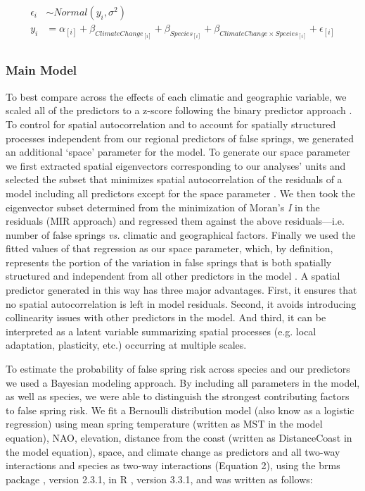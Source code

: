 \documentclass{article}\usepackage[]{graphicx}\usepackage[]{color}
\begin{document}
\begin{align*}
\epsilon_i & \sim Normal(y_i ,  \sigma^{2}) \tag{1}\\
y_i &= \alpha_{[i]} + \beta_{ClimateChange_{[i]}} + \beta_{Species_{[i]}} + \beta_{ClimateChange \times Species_{[i]}} + \epsilon_{[i]} \nonumber\\
\end{align*}

\subsubsection*{Main Model}
To best compare across the effects of each climatic and geographic variable, we scaled all of the predictors to a z-score following the binary predictor approach \citep{Gelman2006}. To control for spatial autocorrelation and to account for spatially structured processes independent from our regional predictors of false springs, we generated an additional `space' parameter for the model. To generate our space parameter we first extracted spatial eigenvectors corresponding to our analyses' units and selected the subset that minimizes spatial autocorrelation of the residuals of a model including all predictors except for the space parameter \citep[][ see supplemental materials `Methods: Spatial parameter' for more details]{diniz2012selection,Baumen2017}. We then took the eigenvector subset determined from the minimization of Moran's \textit{I} in the residuals (MIR approach) and regressed them against the above residuals---i.e. number of false springs \emph{vs.} climatic and geographical factors. Finally we used the fitted values of that regression as our space parameter, which, by definition, represents the portion of the variation in false springs that is both spatially structured and independent from all other predictors in the model \citep[e.g. average spring temperature, elevation, etc.][]{griffith2006spatial,morales2012imprint}. A spatial predictor generated in this way has three major advantages. First, it ensures that no spatial autocorrelation is left in model residuals. Second, it avoids introducing collinearity issues with other predictors in the model. And third, it can be interpreted as a latent variable summarizing spatial processes (e.g. local adaptation, plasticity, etc.) occurring at multiple scales.

To estimate the probability of false spring risk across species and our predictors we used a Bayesian modeling approach. By including all parameters in the model, as well as species, we were able to distinguish the strongest contributing factors to false spring risk. We fit a Bernoulli distribution model (also know as a logistic regression) using mean spring temperature (written as MST in the model equation), NAO, elevation, distance from the coast (written as DistanceCoast in the model equation), space, and climate change as predictors and all two-way interactions and species as two-way interactions (Equation 2), using the brms package \citep{brms}, version 2.3.1,  in R \citep{R}, version 3.3.1, and was written as follows:
\end{document}
